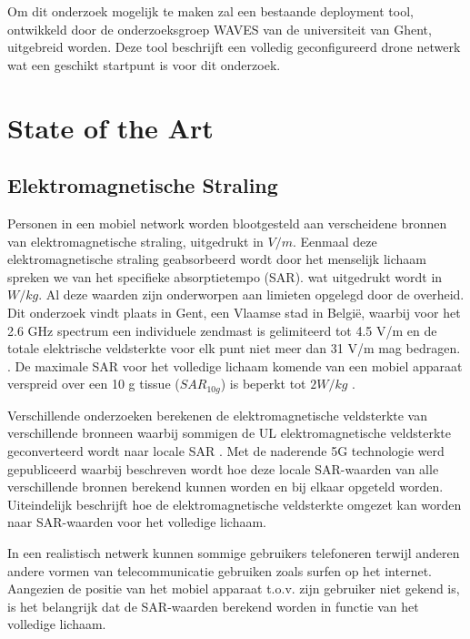 \documentclass[twocolumn]{phdsymp} %
\begin{document}
Om dit onderzoek mogelijk te maken zal een bestaande deployment tool, ontwikkeld
door de onderzoeksgroep WAVES van de universiteit van Ghent, uitgebreid worden. Deze tool 
beschrijft een volledig geconfigureerd drone netwerk wat een geschikt startpunt is voor dit onderzoek.

\section{State of the Art}
\subsection{Elektromagnetische Straling}

Personen in een mobiel network worden blootgesteld aan verscheidene bronnen van elektromagnetische straling, uitgedrukt in $V/m$.
Eenmaal deze elektromagnetische straling geabsorbeerd wordt door het menselijk lichaam spreken we van het specifieke absorptietempo (\gls{SAR}).
wat uitgedrukt wordt in $W/kg$. Al deze waarden zijn onderworpen aan limieten opgelegd door de overheid.
Dit onderzoek vindt plaats in Gent, een Vlaamse stad in Belgi\"e, waarbij voor het 2.6 GHz spectrum een individuele zendmast 
is gelimiteerd tot 4.5 V/m en de totale elektrische veldsterkte voor elk punt niet meer dan 31 V/m mag bedragen.  \cite{J23,S13_normenBelgie}. 
De maximale \gls{SAR} voor het volledige lichaam komende van een mobiel apparaat verspreid over een 
10 g tissue ($SAR_{10g}$) is beperkt tot $2 W/kg$ \cite{J30}. 

Verschillende onderzoeken berekenen de elektromagnetische veldsterkte van verschillende bronneen \cite{J6_originalExposureFormula,J1,J10_RDP,J10.1} 
waarbij sommigen de \gls{UL} elektromagnetische veldsterkte geconverteerd wordt naar locale \gls{SAR} \cite{J10_RDP,J10.1}. 
Met de naderende 5G technologie werd \cite{J17_kuehn2019modelling} gepubliceerd waarbij beschreven wordt hoe 
deze locale  \gls{SAR}-waarden van alle verschillende bronnen berekend kunnen worden en bij elkaar opgeteld worden.
Uiteindelijk beschrijft \cite{J22_plets2015joint} hoe de elektromagnetische veldsterkte omgezet kan worden 
naar \gls{SAR}-waarden voor het volledige lichaam.

In een realistisch netwerk kunnen sommige gebruikers telefoneren terwijl anderen andere vormen van telecommunicatie gebruiken zoals 
surfen op het internet. Aangezien de positie van het mobiel apparaat t.o.v. zijn gebruiker niet gekend is,
is het belangrijk dat de \gls{SAR}-waarden berekend worden in functie van het volledige lichaam. 
\end{document}

